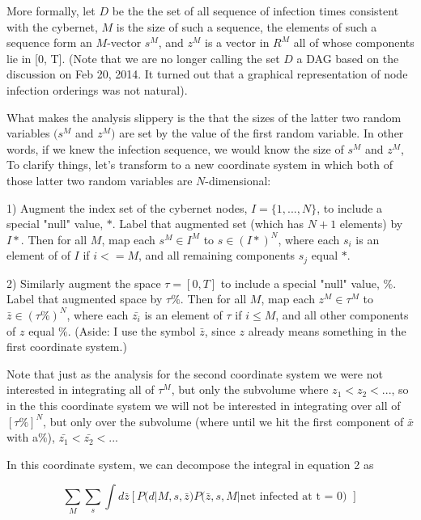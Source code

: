 \documentclass{article}
\begin{document}
    More formally, let $D$ be the the set of all sequence of infection times consistent with 
    the cybernet, $M$ is the size of such a sequence, the elements of such a sequence form an 
    $M$-vector $s^M$, and $z^M$ is a vector in $R^M$ all of whose components lie in 
    [0, T]. (Note that we are no longer calling the set $D$ a DAG based on the discussion on
    Feb 20, 2014. It turned out that a graphical representation of node infection orderings
    was not natural).

    What makes the analysis slippery is the that the sizes of the latter
    two random variables $(s^M$ and $z^M)$ are set by the value of the
    first random variable. In other words, if we knew the infection sequence, we would know 
    the size of $s^M$ and $z^M$,  To clarify things, let's transform to a new coordinate system 
    in which both of those latter two random variables are $N$-dimensional:

    1) Augment the index set of the cybernet nodes, $I = \{1, ..., N\}$, to include a special "null"
    value, $*$. Label that augmented set (which has $N+1$ elements) by $I*$.
    Then for all $M$, map each $s^M \in I^M$ to $s \in (I*)^N$, where each $s_i$ is an element of
    of $I$ if $i <= M$, and all remaining components $s_j$ equal $*$.

    2) Similarly augment the space $\tau = [0, T]$ to include a special "null" value, $\%$.
    Label that augmented space by $\tau\%$. Then for all $M$, map each $z^M \in \tau^M$ to
    $\bar{z} \in (\tau\%)^N$, where each $\bar{z_i}$ is an element of $\tau$ if $i \leq M$, and all other
    components of $z$ equal $\%$. (Aside: I use the symbol $\bar{z}$, since $z$ already means
    something in the first coordinate system.)

    Note that just as the analysis for the second coordinate system we were not interested in integrating
    all of $\tau^M$, but only the subvolume where $z_1 < z_2 < ...$, so in the this coordinate system
    we will not be interested in integrating over all of $[\tau\%]^N$, but only over the subvolume
    (where until we hit the first component of $\bar{x}$ with a$\%$), $\bar{z_1} < \bar{z_2} < ...$

    In this coordinate system, we can decompose the integral in equation 2 as

\begin{equation}
\sum_{M}  \sum_{s}  \int d\bar{z}  [P(d | M, s, \bar{z})  P(\bar{z}, s, M | \text{net infected at t = 0) }]
\end{equation}
\end{document}
